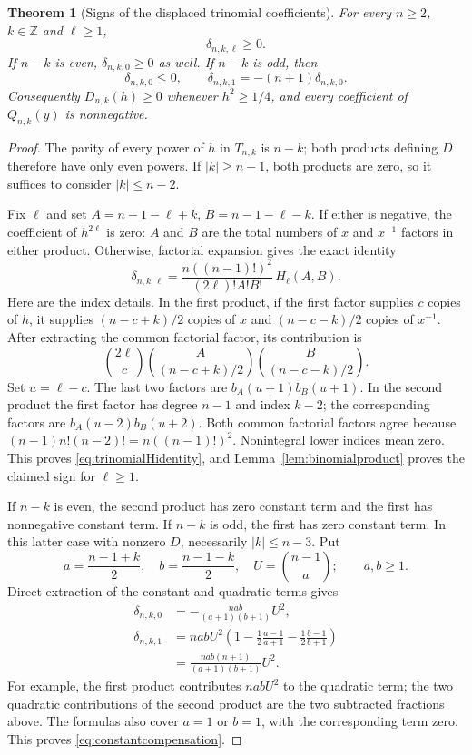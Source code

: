 \documentclass[11pt]{article}
\newtheorem{theorem}{Theorem}
\begin{document}
\begin{theorem}[Signs of the displaced trinomial coefficients]\label{thm:trinomialsigns}
For every $n\geq2$, $k\in\mathbb Z$ and $\ell\geq1$,
\[
 \delta_{n,k,\ell}\geq0.
\]
If $n-k$ is even, $\delta_{n,k,0}\geq0$ as well. If $n-k$ is
odd, then
\begin{equation}\label{eq:constantcompensation}
 \delta_{n,k,0}\leq0,\qquad
 \delta_{n,k,1}=-(n+1)\delta_{n,k,0}.
\end{equation}
Consequently $D_{n,k}(h)\geq0$ whenever $h^2\geq1/4$,
and every coefficient of $Q_{n,k}(y)$ is nonnegative.
\end{theorem}
\begin{proof}
The parity of every power of $h$ in $T_{n,k}$ is $n-k$;
both products defining $D$ therefore have only even powers.
If $|k|\geq n-1$, both products are zero, so it suffices to
consider $|k|\leq n-2$.

Fix $\ell$ and set $A=n-1-\ell+k$, $B=n-1-\ell-k$.
If either is negative, the coefficient of $h^{2\ell}$ is zero:
$A$ and $B$ are the total numbers of $x$ and $x^{-1}$ factors
in either product. Otherwise, factorial expansion gives the exact identity
\begin{equation}\label{eq:trinomialHidentity}
 \delta_{n,k,\ell}
 =\frac{n((n-1)!)^2}{(2\ell)!A!B!}\,H_\ell(A,B).
\end{equation}
Here are the index details. In the first product, if the first
factor supplies $c$ copies of $h$, it supplies
$(n-c+k)/2$ copies of $x$ and $(n-c-k)/2$ copies of $x^{-1}$.
After extracting the common factorial factor, its contribution is
\[
 \binom{2\ell}{c}
 \binom A{(n-c+k)/2}\binom B{(n-c-k)/2}.
\]
Set $u=\ell-c$. The last two factors are $b_A(u+1)b_B(u+1)$.
In the second product the first factor has degree $n-1$ and
index $k-2$; the corresponding factors are
$b_A(u-2)b_B(u+2)$. Both common factorial factors agree because
$(n-1)n!(n-2)!=n((n-1)!)^2$.
Nonintegral lower indices mean zero. This proves
\eqref{eq:trinomialHidentity}, and
Lemma~\ref{lem:binomialproduct} proves the claimed sign for $\ell\geq1$.

If $n-k$ is even, the second product has zero constant term and
the first has nonnegative constant term. If $n-k$ is odd, the
first has zero constant term. In this latter case with nonzero
$D$, necessarily $|k|\leq n-3$. Put
\[
 a=\frac{n-1+k}{2},\quad b=\frac{n-1-k}{2},\quad
 U=\binom{n-1}{a};\qquad a,b\geq1.
\]
Direct extraction of the constant and quadratic terms gives
\begin{align*}
 \delta_{n,k,0}&=-\frac{nab}{(a+1)(b+1)}U^2,\\
 \delta_{n,k,1}&=nabU^2\left(
     1-\frac12\frac{a-1}{a+1}-\frac12\frac{b-1}{b+1}\right)\\
 &=\frac{nab(n+1)}{(a+1)(b+1)}U^2.
\end{align*}
For example, the first product contributes $nabU^2$ to the
quadratic term; the two quadratic contributions of the second
product are the two subtracted fractions above. The formulas
also cover $a=1$ or $b=1$, with the corresponding term zero.
This proves \eqref{eq:constantcompensation}.


\end{proof}
\end{document}
